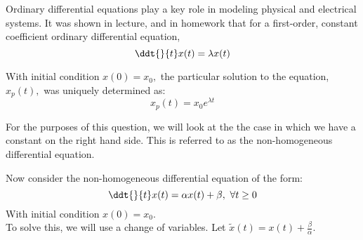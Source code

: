 


Ordinary differential equations play a key role in modeling physical and electrical systems.
It was shown in lecture, and in homework that for a first-order, constant coefficient ordinary differential equation,
\begin{equation} \label{eq:h}
\ddt{}{t} x(t) = \lambda x(t)
\end{equation}

With initial condition $x(0) = x_0,$ the particular solution to the equation, $x_p(t),$ was uniquely determined as:
\begin{equation} \label{eq:hs}
x_p(t) = x_0 e^{\lambda t}
\end{equation}

For the purposes of this question, we will look at the the case in which we have a constant on the right hand side.
This is referred to as the non-homogeneous differential equation.

Now consider the non-homogeneous differential equation of the form:
\begin{equation} \label{eq:nh}
    \ddt{}{t} x(t)  = \alpha x(t) + \beta, \ \forall t \geq 0
\end{equation}
With initial condition $x(0) = x_0.$ \\
To solve this, we will use a change of variables.
Let $\widetilde{x}(t) = x(t) + \frac{\beta}{\alpha}$.

